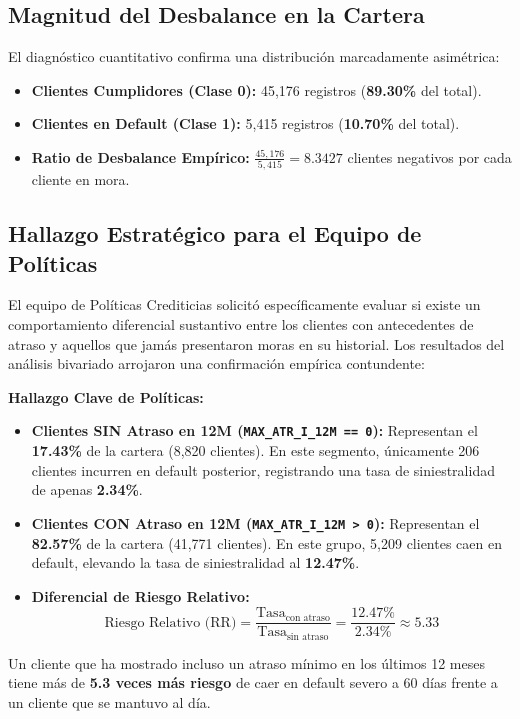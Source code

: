 \documentclass[11pt,a4paper]{article}
\begin{document}
\subsection{Magnitud del Desbalance en la Cartera}
El diagnóstico cuantitativo confirma una distribución marcadamente asimétrica:
\begin{itemize}
    \item \textbf{Clientes Cumplidores (Clase 0):} 45,176 registros (\textbf{89.30\%} del total).
    \item \textbf{Clientes en Default (Clase 1):} 5,415 registros (\textbf{10.70\%} del total).
    \item \textbf{Ratio de Desbalance Empírico:} $\frac{45,176}{5,415} = \mathbf{8.3427}$ clientes negativos por cada cliente en mora.
\end{itemize}

\subsection{Hallazgo Estratégico para el Equipo de Políticas}
El equipo de Políticas Crediticias solicitó específicamente evaluar si existe un comportamiento diferencial sustantivo entre los clientes con antecedentes de atraso y aquellos que jamás presentaron moras en su historial. Los resultados del análisis bivariado arrojaron una confirmación empírica contundente:

\begin{hallazgobox}
\textbf{\color{ContinentalRed}Hallazgo Clave de Políticas:}\\
\begin{itemize}[leftmargin=1cm]
    \item \textbf{Clientes SIN Atraso en 12M (\texttt{MAX\_ATR\_I\_12M == 0}):} Representan el \textbf{17.43\%} de la cartera (8,820 clientes). En este segmento, únicamente 206 clientes incurren en default posterior, registrando una tasa de siniestralidad de apenas \textbf{2.34\%}.
    \item \textbf{Clientes CON Atraso en 12M (\texttt{MAX\_ATR\_I\_12M > 0}):} Representan el \textbf{82.57\%} de la cartera (41,771 clientes). En este grupo, 5,209 clientes caen en default, elevando la tasa de siniestralidad al \textbf{12.47\%}.
    \item \textbf{Diferencial de Riesgo Relativo:}
    \begin{equation}
    \text{Riesgo Relativo (RR)} = \frac{\text{Tasa}_{\text{con atraso}}}{\text{Tasa}_{\text{sin atraso}}} = \frac{12.47\%}{2.34\%} \approx \mathbf{5.33}
    \end{equation}
\end{itemize}
Un cliente que ha mostrado incluso un atraso mínimo en los últimos 12 meses tiene más de \textbf{5.3 veces más riesgo} de caer en default severo a 60 días frente a un cliente que se mantuvo al día.
\end{hallazgobox}
\end{document}
